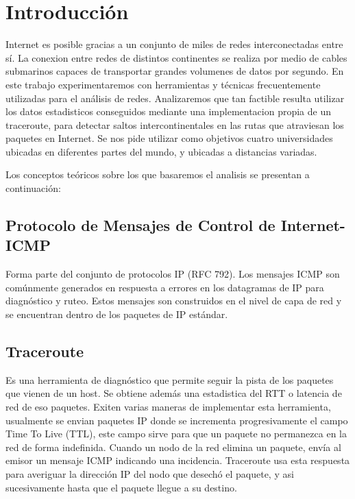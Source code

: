 \section{Introducción}

Internet es posible gracias a un conjunto de miles de redes interconectadas entre sí.
La conexion entre redes de distintos continentes se realiza por medio de cables submarinos capaces de transportar grandes volumenes de datos por segundo.
En este trabajo experimentaremos con herramientas y técnicas frecuentemente utilizadas para el análisis de redes.
Analizaremos que tan factible resulta utilizar los datos estadisticos conseguidos mediante una implementacion propia de un traceroute, para detectar saltos intercontinentales en las rutas que atraviesan los paquetes en Internet.  
Se nos pide utilizar como objetivos cuatro universidades ubicadas en diferentes partes del mundo, y ubicadas a distancias variadas.

Los conceptos teóricos sobre los que basaremos el analisis se presentan a continuación: 

\subsection{Protocolo de Mensajes de Control de Internet- ICMP}

Forma parte del conjunto de protocolos IP (RFC 792). Los mensajes ICMP son comúnmente generados en respuesta a errores en los datagramas de IP para diagnóstico y ruteo. Estos mensajes son construidos en el nivel de capa de red y se encuentran dentro de los paquetes de IP estándar.

\subsection{Traceroute}

Es una herramienta de diagnóstico que permite seguir la pista de los paquetes que vienen de un host. Se obtiene además una estadistica del RTT o latencia de red de eso paquetes.
Exiten varias maneras de implementar esta herramienta, usualmente se envian paquetes IP donde se incrementa progresivamente el campo Time To Live (TTL), este campo sirve para que un paquete no permanezca en la red de forma indefinida. Cuando un nodo de la red elimina un paquete, envía al emisor un mensaje ICMP indicando una incidencia. Traceroute usa esta respuesta para averiguar la dirección IP del nodo que desechó el paquete, y asi sucesivamente hasta que el paquete llegue a su destino.

